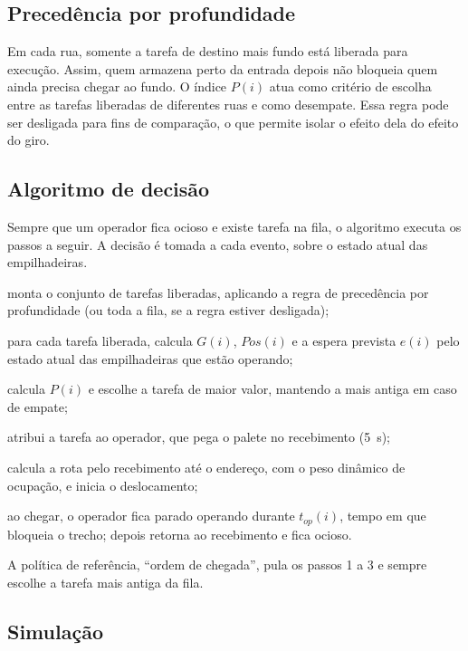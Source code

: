 \documentclass[
	article,
	11pt,
	oneside,
	a4paper,
	english,
	brazil,
	sumario=tradicional
	]{abntex2}
\begin{document}
\subsection{Precedência por profundidade}

Em cada rua, somente a tarefa de destino mais fundo está liberada para
execução. Assim, quem armazena perto da entrada depois não bloqueia quem ainda
precisa chegar ao fundo. O índice $P(i)$ atua como critério de escolha entre as
tarefas liberadas de diferentes ruas e como desempate. Essa regra pode ser
desligada para fins de comparação, o que permite isolar o efeito dela do efeito
do giro.

\subsection{Algoritmo de decisão}

Sempre que um operador fica ocioso e existe tarefa na fila, o algoritmo executa
os passos a seguir. A decisão é tomada a cada evento, sobre o estado atual das
empilhadeiras.

\begin{alineas}
	\item monta o conjunto de tarefas liberadas, aplicando a regra de
	precedência por profundidade (ou toda a fila, se a regra estiver desligada);
	\item para cada tarefa liberada, calcula $G(i)$, $Pos(i)$ e a espera prevista
	$e(i)$ pelo estado atual das empilhadeiras que estão operando;
	\item calcula $P(i)$ e escolhe a tarefa de maior valor, mantendo a mais
	antiga em caso de empate;
	\item atribui a tarefa ao operador, que pega o palete no recebimento (5~s);
	\item calcula a rota pelo recebimento até o endereço, com o peso dinâmico
	de ocupação, e inicia o deslocamento;
	\item ao chegar, o operador fica parado operando durante $t_{op}(i)$, tempo em
	que bloqueia o trecho; depois retorna ao recebimento e fica ocioso.
\end{alineas}

A política de referência, ``ordem de chegada'', pula os passos 1 a 3 e sempre
escolhe a tarefa mais antiga da fila.

\subsection{Simulação}
\end{document}
